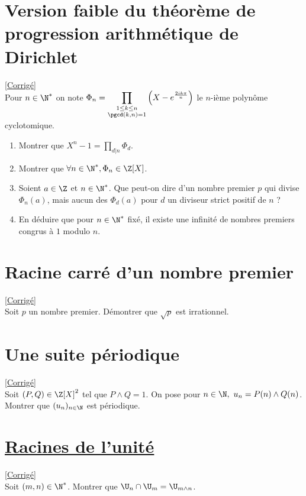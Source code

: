 \documentclass[8pt]{book}
\begin{document}
\section{Version faible du théorème de progression arithmétique de Dirichlet }
\label{Version, faible du théorème de progression arithmétique de Dirichlet}
\textcolor{blue}{\hyperref[Version faible du théorème de progression arithmétique de Dirichlet corrigé]{[Corrigé]}}\\
Pour $n\in \N^*$ on note $\Phi_n=\displaystyle\prod_{\substack{1\leq k\leq n\\\pgcd(k,n)=1}}{\left(X-e^{\frac{2ik\pi}{n}}\right)}$ le $n$-ième polynôme cyclotomique.
\begin{enumerate}[leftmargin=*]
	\item Montrer que $X^n-1=\displaystyle\prod_{d|n}{\Phi_d}$.
	\item Montrer que $\forall n\in \N^*,\Phi_n\in \Z[X]$.
	\item Soient $a\in \Z$ et $n\in \N^*$. Que peut-on dire d'un nombre premier $p$ qui divise $\Phi_n(a)$, mais aucun des $\Phi_d(a)$ pour $d$ un diviseur strict positif de $n$ ?
	\item En déduire que pour $n\in \N^*$ fixé, il existe une infinité de nombres premiers congrus à $1$ modulo $n$.
\end{enumerate}


\section{Racine carré d'un nombre premier }
\label{Racine carré d'un nombre premier}
\textcolor{blue}{\hyperref[Racine carré d'un nombre premier corrigé]{[Corrigé]}}\\
Soit $p$ un nombre premier. Démontrer que $\sqrt p$ est irrationnel.

\section{Une suite périodique }
\label{Une suite périodique}
\textcolor{blue}{\hyperref[Une suite périodique corrigé]{[Corrigé]}}\\
Soit $(P,Q)\in \Z[X]^2$ tel que $P\wedge Q=1$. On pose pour $n\in \N,\ u_n=P(n)\wedge Q(n)$. Montrer que $(u_n)_{n\in \N}$ est périodique.

\section{\underline{Racines de l'unité} }
\label{Racines de l'unité}
\textcolor{blue}{\hyperref[Racines de l'unité corrigé]{[Corrigé]}}\\
Soit $(m,n)\in \N^*$. Montrer que $\U_n\cap \U_m=\U_{m\wedge n}$.
\end{document}
